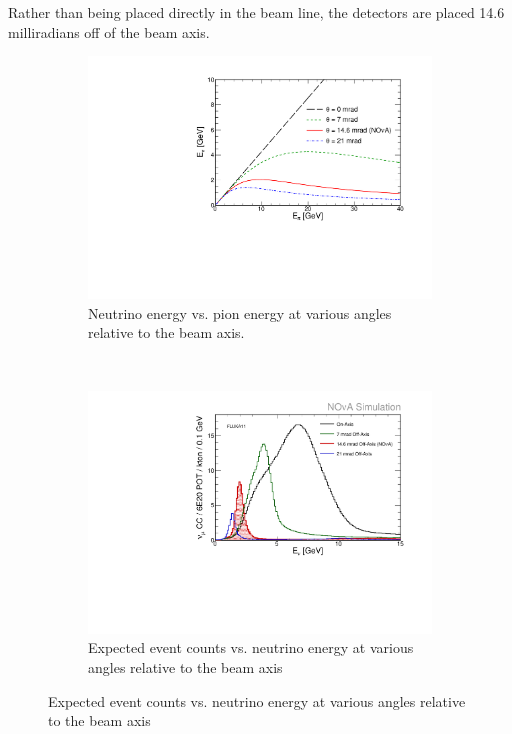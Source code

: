 Rather than being placed directly in the \numi beam line, the \nova detectors are placed 14.6 milliradians off of the beam axis.  
\begin{figure}[t]
\centering
\begin{subfigure}[c]{0.47\textwidth}
                \centering
                \includegraphics[width=\textwidth]{figures/plots/nova/EnuVSEpi_NOvA-0-7-21.pdf}
                \caption{Neutrino energy vs. pion energy at various angles relative to the beam axis.}
                 \label{EnuEpi}
        \end{subfigure}
        ~
\begin{subfigure}[c]{0.47\textwidth}
                \centering
                \includegraphics[width=\textwidth]{figures/plots/nova/spectrum_FD_NOvA-0-7-21.pdf}
                \caption{Expected \numu event counts vs. neutrino energy at various angles relative to the beam axis}
                \label{fluxEnu}


\end{subfigure}
\end{figure}
